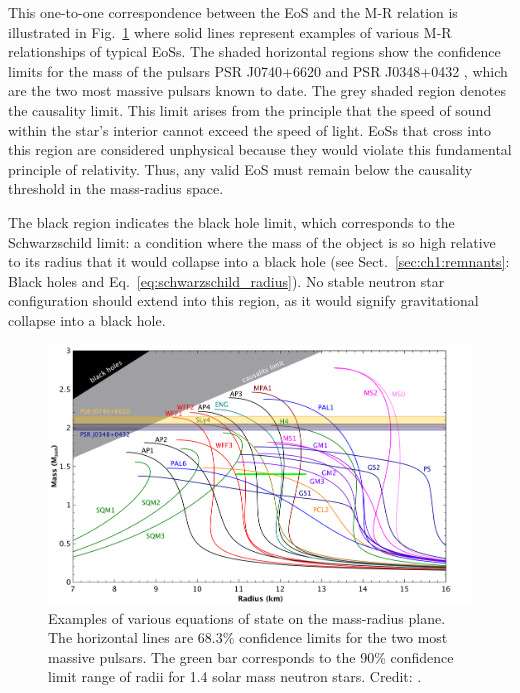 \documentclass[main.tex]{subfiles}
\begin{document}
    This one-to-one correspondence between the EoS and the M-R relation is illustrated in Fig.~\ref{fig:M-R} where solid lines represent examples of various M-R relationships of typical EoSs. The shaded horizontal regions show the confidence limits for the mass of the pulsars PSR J0740+6620 \citep{2020NatAs...4...72C, Fonseca_2021} and PSR J0348+0432 \citep{antoniadis:2013sci}, which are the two most massive pulsars known to date. The grey shaded region denotes the causality limit. This limit arises from the principle that the speed of sound within the star's interior cannot exceed the speed of light. EoSs that cross into this region are considered unphysical because they would violate this fundamental principle of relativity. Thus, any valid EoS must remain below the causality threshold in the mass-radius space.

    The black region indicates the black hole limit, which corresponds to the Schwarzschild limit: a condition where the mass of the object is so high relative to its radius that it would collapse into a black hole (see Sect.~\ref{sec:ch1:remnants}: Black holes and Eq.~\ref{eq:schwarzschild_radius}). No stable neutron star configuration should extend into this region, as it would signify gravitational collapse into a black hole.

    \begin{figure}
        \centering
        \includegraphics[scale=0.25]{figures/chapter1/M-R.pdf}
        \caption{Examples of various equations of state on the mass-radius plane. The horizontal lines are 68.3\% confidence limits for the two most massive pulsars. The green bar corresponds to the 90\% confidence limit range of radii for 1.4 solar mass neutron stars. Credit: \cite{freire_ns_masses}.}
        \label{fig:M-R}
    \end{figure}
\end{document}
